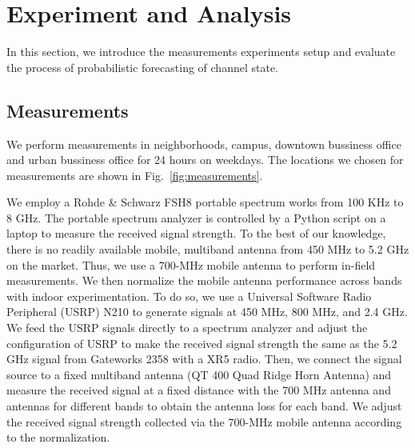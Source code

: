 \section{Experiment and Analysis}
\label{sec:experiment}

In this section, we introduce the measurements experiments setup and 
evaluate the process of probabilistic forecasting of channel state.

\subsection{Measurements}
\label{subsec:measurements}

We perform measurements in neighborhoods, campus, downtown bussiness office and 
urban bussiness office for 24 hours on weekdays. 
The locations we chosen for measurements are shown in Fig.~\ref{fig:measurements}.

We employ a Rohde \& Schwarz FSH8 portable spectrum works from 100 KHz to 8 GHz. 
The portable spectrum analyzer is controlled by a Python script on a laptop to measure 
the received signal strength.
To the best of our knowledge, there is no readily available mobile, multiband antenna from
450 MHz to 5.2 GHz on the market. Thus, we use a 700-MHz mobile antenna to perform in-field
measurements. We then normalize the mobile antenna performance across bands with indoor 
experimentation. To do so, we use a Universal Software Radio Peripheral (USRP) N210 to 
generate signals at 450 MHz, 800 MHz, and 2.4 GHz. We feed the USRP signals directly
to a spectrum analyzer and adjust the configuration of USRP to make the received signal 
strength the same as the 5.2 GHz signal from Gateworks 2358 with a XR5 radio. Then, we connect 
the signal source to a fixed multiband antenna (QT 400 Quad Ridge Horn Antenna) and measure the
received signal at a fixed distance with the 700 MHz antenna and antennas for different bands
to obtain the antenna loss for each band. We adjust the received signal strength
collected via the 700-MHz mobile antenna according to the normalization.


